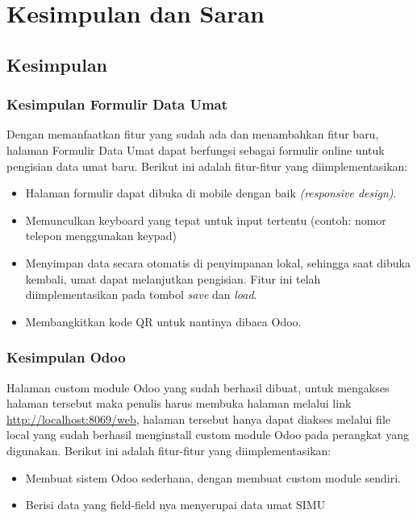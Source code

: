 \chapter{Kesimpulan dan Saran}
\label{chap:kesimpulandansaran}

\section{Kesimpulan}
\label{sec:kesimpulan}

\subsection{Kesimpulan Formulir Data Umat}
\label{sec:6:kesimpulanFormulir}

Dengan memanfaatkan fitur yang sudah ada dan menambahkan fitur baru, halaman Formulir Data Umat dapat berfungsi sebagai formulir online untuk pengisian data umat baru. Berikut ini adalah fitur-fitur yang diimplementasikan:
	
\begin{itemize}
	\item Halaman formulir dapat dibuka di mobile dengan baik \textit{(responsive design)}.
	\item Memunculkan keyboard yang tepat untuk input tertentu (contoh: nomor telepon menggunakan keypad)
	\item Menyimpan data secara otomatis di penyimpanan lokal, sehingga saat dibuka kembali, umat dapat melanjutkan pengisian. Fitur ini telah diimplementasikan pada tombol \textit{save} dan \textit{load}.
	\item Membangkitkan kode QR untuk nantinya dibaca Odoo.
\end{itemize}

\subsection{Kesimpulan Odoo}
\label{sec:6:kesimpulanOdoo}

Halaman custom module Odoo yang sudah berhasil dibuat, untuk mengakses halaman tersebut maka penulis harus membuka halaman melalui link \url{http://localhost:8069/web}, halaman tersebut hanya dapat diakses melalui file local yang sudah berhasil menginstall custom module Odoo pada perangkat yang digunakan. Berikut ini adalah fitur-fitur yang diimplementasikan:

\begin{itemize}
	\item Membuat sistem Odoo sederhana, dengan membuat custom module sendiri.
	\item Berisi data yang field-field nya menyerupai data umat SIMU
\end{itemize}

